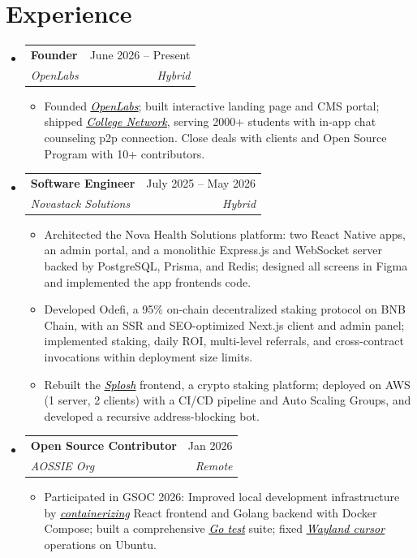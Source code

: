 \documentclass[letterpaper,11pt]{article}
\makeatletter
\newcommand{\resumeItem}[1]{
  \item\small{{#1}}
}
\newcommand{\resumeSubheading}[4]{
  \item
    \begin{tabular*}{0.97\textwidth}[t]{l@{\extracolsep{\fill}}r}
      \textbf{#1} & #2 \\
      \textit{\small#3} & \textit{\small #4} \\
    \end{tabular*}
}
\newcommand{\resumeSubHeadingListStart}{\begin{itemize}[leftmargin=0.15in, label={}, topsep=1pt, itemsep=2pt, parsep=0pt]}
\newcommand{\resumeSubHeadingListEnd}{\end{itemize}}
\newcommand{\resumeItemListStart}{\begin{itemize}[leftmargin=0.15in, topsep=1pt, itemsep=1pt, parsep=0pt]}
\newcommand{\resumeItemListEnd}{\end{itemize}}
\makeatother
\begin{document}
\section{Experience}
  \resumeSubHeadingListStart

  \resumeSubheading
    {Founder}{June 2026 -- Present}
    {OpenLabs}{Hybrid}
    \resumeItemListStart
      \resumeItem{Founded \href{https://openlabsdevs.com}{\textcolor{black}{\textit{\ul{OpenLabs}}}}; built interactive landing page and CMS portal; shipped \href{https://collegenetwork.space}{\textcolor{black}{\textit{\ul{College Network}}}}, serving 2000+ students with in-app chat counseling p2p connection. Close deals with clients and Open Source Program with 10+ contributors.}
    \resumeItemListEnd

    \resumeSubheading
      {Software Engineer}{July 2025 -- May 2026}
      {Novastack Solutions}{Hybrid}
      \resumeItemListStart
        \resumeItem{Architected the Nova Health Solutions platform: two React Native apps, an admin portal, and a monolithic Express.js and WebSocket server backed by PostgreSQL, Prisma, and Redis; designed all screens in Figma and implemented the app frontends code.}
        \resumeItem{Developed Odefi, a 95\% on-chain decentralized staking protocol on BNB Chain, with an SSR and SEO-optimized Next.js client and admin panel; implemented staking, daily ROI, multi-level referrals, and cross-contract invocations within deployment size limits.}
        \resumeItem{Rebuilt the \href{https://splosh.app/}{\textcolor{black}{\textit{\ul{Splosh}}}} frontend, a crypto staking platform; deployed on AWS (1 server, 2 clients) with a CI/CD pipeline and Auto Scaling Groups, and developed a recursive address-blocking bot.}
      \resumeItemListEnd

      \resumeSubheading
        {Open Source Contributor}{Jan 2026}
        {AOSSIE Org}{Remote}
        \resumeItemListStart
          \resumeItem{Participated in GSOC 2026: Improved local development infrastructure by \href{https://github.com/AOSSIE-Org/DebateAI/pull/179}{\textcolor{black}{\textit{\ul{containerizing}}}} React frontend and Golang backend with Docker Compose; built a comprehensive \href{https://github.com/AOSSIE-Org/DebateAI/pull/253}{\textcolor{black}{\textit{\ul{Go test}}}} suite; fixed \href{https://github.com/AOSSIE-Org/Rein/pull/200}{\textcolor{black}{\textit{\ul{Wayland cursor}}}} operations on Ubuntu.}
        \resumeItemListEnd

  \resumeSubHeadingListEnd
\end{document}
